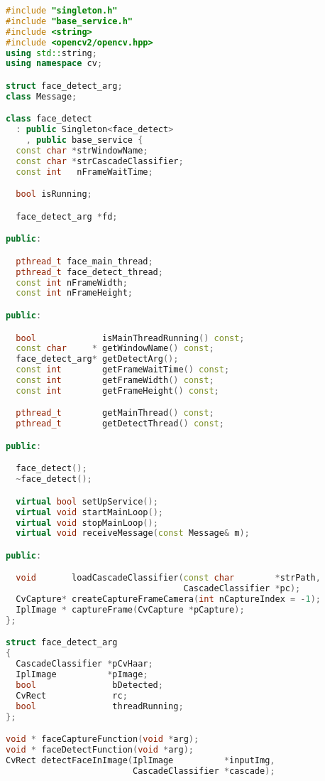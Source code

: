 \begin{lstlisting}[caption=face-detect.h,language=C++]
#include "singleton.h"
#include "base_service.h"
#include <string>
#include <opencv2/opencv.hpp>
using std::string;
using namespace cv;

struct face_detect_arg;
class Message;

class face_detect
  : public Singleton<face_detect>
    , public base_service {
  const char *strWindowName;
  const char *strCascadeClassifier;
  const int   nFrameWaitTime;

  bool isRunning;

  face_detect_arg *fd;

public:

  pthread_t face_main_thread;
  pthread_t face_detect_thread;
  const int nFrameWidth;
  const int nFrameHeight;

public:

  bool             isMainThreadRunning() const;
  const char     * getWindowName() const;
  face_detect_arg* getDetectArg();
  const int        getFrameWaitTime() const;
  const int        getFrameWidth() const;
  const int        getFrameHeight() const;

  pthread_t        getMainThread() const;
  pthread_t        getDetectThread() const;

public:

  face_detect();
  ~face_detect();

  virtual bool setUpService();
  virtual void startMainLoop();
  virtual void stopMainLoop();
  virtual void receiveMessage(const Message& m);

public:

  void       loadCascadeClassifier(const char        *strPath,
                                   CascadeClassifier *pc);
  CvCapture* createCaptureFrameCamera(int nCaptureIndex = -1);
  IplImage * captureFrame(CvCapture *pCapture);
};

struct face_detect_arg
{
  CascadeClassifier *pCvHaar;
  IplImage          *pImage;
  bool               bDetected;
  CvRect             rc;
  bool               threadRunning;
};

void * faceCaptureFunction(void *arg);
void * faceDetectFunction(void *arg);
CvRect detectFaceInImage(IplImage          *inputImg,
                         CascadeClassifier *cascade);

\end{lstlisting}








